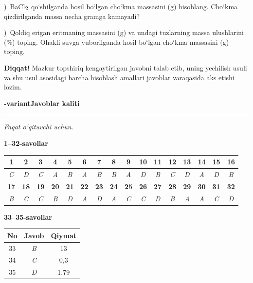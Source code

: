 \documentclass[11pt,a4paper]{article}
\renewcommand{\textsubscript}[1]{\ensuremath{_{\text{\fontsize{8}{8}\selectfont #1}}}}
\newcommand{\qsep}{\par\vspace{13pt}}
\newcommand{\diqqat}[1]{\par\smallskip\noindent\textbf{Diqqat!} #1\par\medskip}
\begin{document}
)\ BaCl\textsubscript{2} qo`shilganda hosil bo`lgan cho`kma massasini (g) hisoblang. Cho`kma qizdirilganda massa necha gramga kamayadi?\par
{})\ Qoldiq erigan eritmaning massasini (g) va undagi tuzlarning massa ulushlarini (\%) toping. Ohakli suvga yuborilganda hosil bo`lgan cho`kma massasini (g) toping.\par
\diqqat{Mazkur topshiriq kengaytirilgan javobni talab etib, uning yechilish usuli va shu usul asosidagi barcha hisoblash amallari javoblar varaqasida aks etishi lozim.}\qsep
\newpage
\noindent\textbf{\fontsize{13}{15}-variant}\hfill \textbf{Javoblar kaliti}\par\smallskip\hrule\smallskip
\textit{Faqat o`qituvchi uchun.}\par\medskip
\noindent\textbf{1--32-savollar}\par\smallskip
\noindent\begin{tabular}{|c|c|c|c|c|c|c|c|c|c|c|c|c|c|c|c|}\hline
\textbf{1} & \textbf{2} & \textbf{3} & \textbf{4} & \textbf{5} & \textbf{6} & \textbf{7} & \textbf{8} & \textbf{9} & \textbf{10} & \textbf{11} & \textbf{12} & \textbf{13} & \textbf{14} & \textbf{15} & \textbf{16}\\\hline
\textsl{C} & \textsl{D} & \textsl{C} & \textsl{A} & \textsl{B} & \textsl{A} & \textsl{B} & \textsl{B} & \textsl{A} & \textsl{D} & \textsl{B} & \textsl{C} & \textsl{D} & \textsl{A} & \textsl{D} & \textsl{B}\\\hline
\textbf{17} & \textbf{18} & \textbf{19} & \textbf{20} & \textbf{21} & \textbf{22} & \textbf{23} & \textbf{24} & \textbf{25} & \textbf{26} & \textbf{27} & \textbf{28} & \textbf{29} & \textbf{30} & \textbf{31} & \textbf{32}\\\hline
\textsl{B} & \textsl{C} & \textsl{C} & \textsl{B} & \textsl{D} & \textsl{A} & \textsl{D} & \textsl{A} & \textsl{C} & \textsl{C} & \textsl{D} & \textsl{B} & \textsl{A} & \textsl{A} & \textsl{C} & \textsl{D}\\\hline
\end{tabular}\par\medskip
\noindent\textbf{33--35-savollar}\par\smallskip
\noindent\begin{tabular}{|c|c|c|}\hline \textbf{No} & \textbf{Javob} & \textbf{Qiymat}\\\hline
33 & \textsl{B} & 13\\\hline
34 & \textsl{C} & 0,3\\\hline
35 & \textsl{D} & 1,79\\\hline
\end{tabular}\par\medskip
\end{document}
